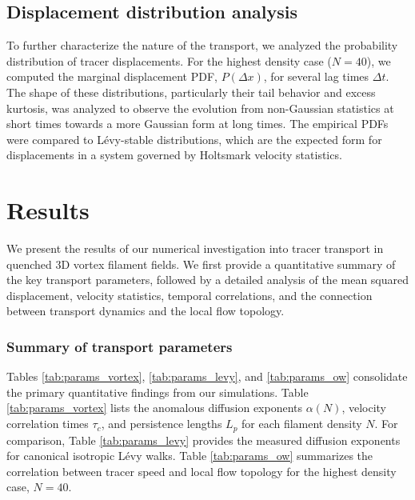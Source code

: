 \documentclass[]{article}
\begin{document}
\subsection{Displacement distribution analysis}
To further characterize the nature of the transport, we analyzed the probability distribution of tracer displacements. For the highest density case ($N=40$), we computed the marginal displacement PDF, $P(\Delta x)$, for several lag times $\Delta t$. The shape of these distributions, particularly their tail behavior and excess kurtosis, was analyzed to observe the evolution from non-Gaussian statistics at short times towards a more Gaussian form at long times. The empirical PDFs were compared to L\'evy-stable distributions, which are the expected form for displacements in a system governed by Holtsmark velocity statistics.

\section{Results}
\label{sec:results}
We present the results of our numerical investigation into tracer transport in quenched 3D vortex filament fields. We first provide a quantitative summary of the key transport parameters, followed by a detailed analysis of the mean squared displacement, velocity statistics, temporal correlations, and the connection between transport dynamics and the local flow topology.

\subsubsection{Summary of transport parameters}

Tables \ref{tab:params_vortex}, \ref{tab:params_levy}, and \ref{tab:params_ow} consolidate the primary quantitative findings from our simulations. Table \ref{tab:params_vortex} lists the anomalous diffusion exponents $\alpha(N)$, velocity correlation times $\tau_c$, and persistence lengths $L_p$ for each filament density $N$. For comparison, Table \ref{tab:params_levy} provides the measured diffusion exponents for canonical isotropic L\'evy walks. Table \ref{tab:params_ow} summarizes the correlation between tracer speed and local flow topology for the highest density case, $N=40$.
\end{document}
